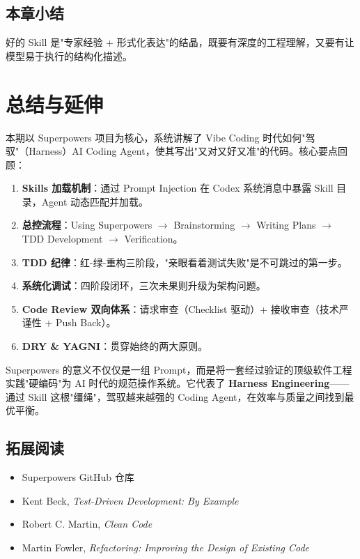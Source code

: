 \documentclass[a4paper]{article}
\begin{document}
\subsection{本章小结}

好的 Skill 是"专家经验 + 形式化表达"的结晶，既要有深度的工程理解，又要有让模型易于执行的结构化描述。


\section{总结与延伸}

本期以 Superpowers 项目为核心，系统讲解了 Vibe Coding 时代如何"驾驭"（Harness）AI Coding Agent，使其写出"又对又好又准"的代码。核心要点回顾：

\begin{enumerate}
    \item \textbf{Skills 加载机制}：通过 Prompt Injection 在 Codex 系统消息中暴露 Skill 目录，Agent 动态匹配并加载。
    \item \textbf{总控流程}：Using Superpowers $\rightarrow$ Brainstorming $\rightarrow$ Writing Plans $\rightarrow$ TDD Development $\rightarrow$ Verification。
    \item \textbf{TDD 纪律}：红-绿-重构三阶段，"亲眼看着测试失败"是不可跳过的第一步。
    \item \textbf{系统化调试}：四阶段闭环，三次未果则升级为架构问题。
    \item \textbf{Code Review 双向体系}：请求审查（Checklist 驱动）+ 接收审查（技术严谨性 + Push Back）。
    \item \textbf{DRY \& YAGNI}：贯穿始终的两大原则。
\end{enumerate}

Superpowers 的意义不仅仅是一组 Prompt，而是将一套经过验证的顶级软件工程实践"硬编码"为 AI 时代的规范操作系统。它代表了 \textbf{Harness Engineering}——通过 Skill 这根"缰绳"，驾驭越来越强的 Coding Agent，在效率与质量之间找到最优平衡。

\subsection{拓展阅读}

\begin{itemize}
    \item Superpowers GitHub 仓库
    \item Kent Beck, \textit{Test-Driven Development: By Example}
    \item Robert C. Martin, \textit{Clean Code}
    \item Martin Fowler, \textit{Refactoring: Improving the Design of Existing Code}
\end{itemize}

\end{document}
